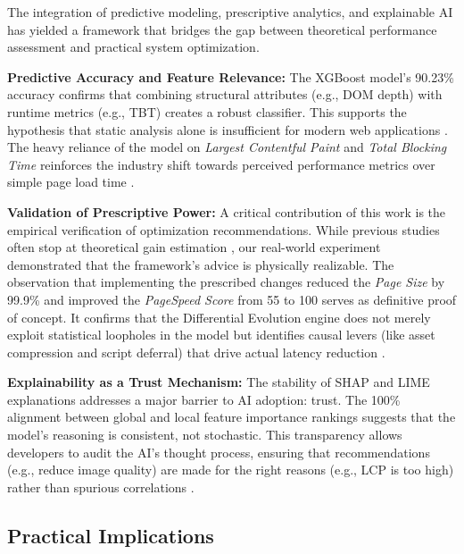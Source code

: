 \documentclass[sn-nature]{sn-jnl}
\begin{document}
The integration of predictive modeling, prescriptive analytics, and explainable AI has yielded a framework that bridges the gap between theoretical performance assessment and practical system optimization.

\textbf{Predictive Accuracy and Feature Relevance:}
The XGBoost model's 90.23\% accuracy confirms that combining structural attributes (e.g., DOM depth) with runtime metrics (e.g., TBT) creates a robust classifier. This supports the hypothesis that static analysis alone is insufficient for modern web applications \cite{ghattas2025, mathur2024}. The heavy reliance of the model on \textit{Largest Contentful Paint} and \textit{Total Blocking Time} reinforces the industry shift towards perceived performance metrics over simple page load time \cite{sehwag2024, vanriet2023}.

\textbf{Validation of Prescriptive Power:}
A critical contribution of this work is the empirical verification of optimization recommendations. While previous studies often stop at theoretical gain estimation \cite{notz2024}, our real-world experiment demonstrated that the framework's advice is physically realizable. The observation that implementing the prescribed changes reduced the \textit{Page Size} by 99.9\% and improved the \textit{PageSpeed Score} from 55 to 100 serves as definitive proof of concept. It confirms that the Differential Evolution engine does not merely exploit statistical loopholes in the model but identifies causal levers (like asset compression and script deferral) that drive actual latency reduction \cite{surianarayanan2023}.

\textbf{Explainability as a Trust Mechanism:}
The stability of SHAP and LIME explanations addresses a major barrier to AI adoption: trust. The 100\% alignment between global and local feature importance rankings suggests that the model's reasoning is consistent, not stochastic. This transparency allows developers to audit the AI's thought process, ensuring that recommendations (e.g., reduce image quality) are made for the right reasons (e.g., LCP is too high) rather than spurious correlations \cite{salih2024, goldwasser2024}.

\subsection{Practical Implications}
\end{document}
